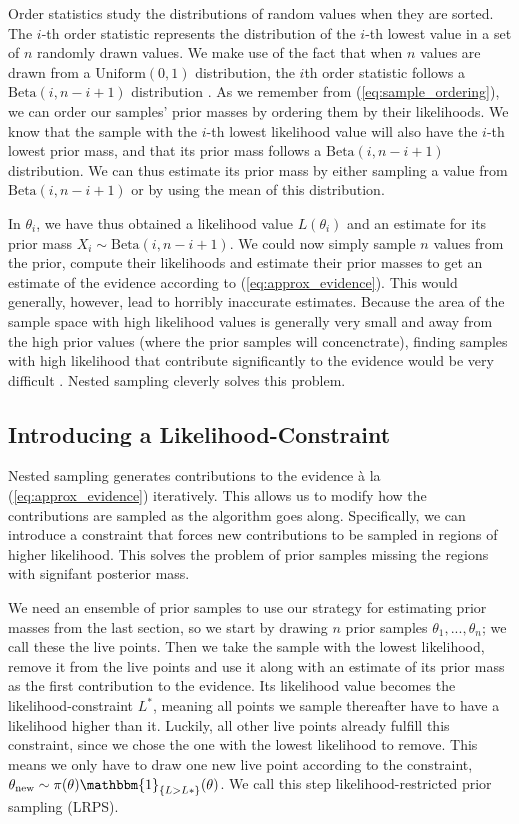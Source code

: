 \documentclass[12pt, a4paper]{report}
\begin{document}
Order statistics study the distributions of random values when they are sorted.
The $i$-th order statistic represents the distribution of the $i$-th lowest value in a set of $n$ randomly drawn values.
We make use of the fact that when $n$ values are drawn from a $\textrm{Uniform}(0,1)$ distribution, the $i$th order statistic follows a $\textrm{Beta}(i, n-i+1)$ distribution \cite[63]{computational_stats}.
As we remember from (\ref{eq:sample_ordering}), we can order our samples' prior masses by ordering them by their likelihoods.
We know that the sample with the $i$-th lowest likelihood value will also have the $i$-th lowest prior mass, and that its prior mass follows a $\textrm{Beta}(i, n-i+1)$ distribution.
We can thus estimate its prior mass by either sampling a value from $\textrm{Beta}(i, n-i+1)$ or by using the mean of this distribution.

In $\theta_{i}$, we have thus obtained a likelihood value $L(\theta_{i})$ and an estimate for its prior mass $X_{i} \sim  \textrm{Beta}(i,n-i+1)$.
We could now simply sample $n$ values from the prior, compute their likelihoods and estimate their prior masses to get an estimate of the evidence according to (\ref{eq:approx_evidence}).
This would generally, however, lead to horribly inaccurate estimates.
Because the area of the sample space with high likelihood values is generally very small and away from the high prior values (where the prior samples will concenctrate), finding samples with high likelihood that contribute significantly to the evidence would be very difficult \cite[7]{skilling}.
Nested sampling cleverly solves this problem.

\subsection{Introducing a Likelihood-Constraint}
Nested sampling generates contributions to the evidence à la (\ref{eq:approx_evidence}) iteratively.
This allows us to modify how the contributions are sampled as the algorithm goes along.
Specifically, we can introduce a constraint that forces new contributions to be sampled in regions of higher likelihood.
This solves the problem of prior samples missing the regions with signifant posterior mass.

We need an ensemble of prior samples to use our strategy for estimating prior masses from the last section, so we start by drawing $n$ prior samples $\theta_1, ..., \theta_n$; we call these the live points.
Then we take the sample with the lowest likelihood, remove it from the live points and use it along with an estimate of its prior mass as the first contribution to the evidence.
Its likelihood value becomes the likelihood-constraint $L^*$, meaning all points we sample thereafter have to have a likelihood higher than it.
Luckily, all other live points already fulfill this constraint, since we chose the one with the lowest likelihood to remove.
This means we only have to draw one new live point according to the constraint, $\theta_{\textrm{new}} \sim \pi(\theta) \mathbbm{1}_{\{L > L*\}}(\theta)$.
We call this step likelihood-restricted prior sampling (LRPS).
\end{document}
